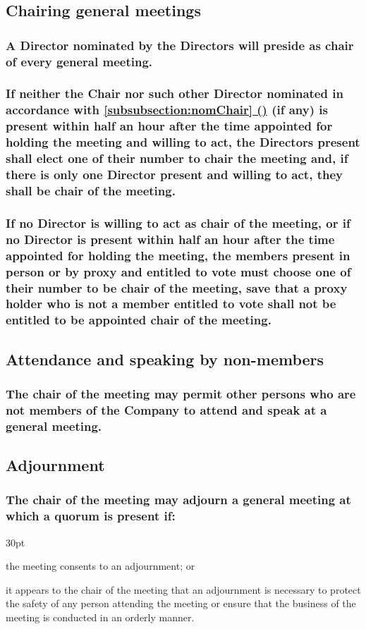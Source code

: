 \documentclass[12pt]{article}
\newcommand*{\fancyref}[1]{\hyperref[{#1}]{\autoref*{#1} (\nameref*{#1})}}
\def\clauseindent{30pt}
\newenvironment{subindentpara}{\begin{adjustwidth}{\clauseindent}{}\begin{hanginglist}}{\end{hanginglist}\end{adjustwidth}}
\begin{document}
\subsection{Chairing general meetings}
\subsubsection[Nominal chairing of general meetings]{\label{subsubsection:nomChair}A Director nominated by the Directors will preside as chair of every general meeting.}
\subsubsection{If neither the Chair nor such other Director nominated in accordance with \fancyref{subsubsection:nomChair} (if any) is present within half an hour after the time appointed for holding the meeting and willing to act, the Directors present shall elect one of their number to chair the meeting and, if there is only one Director present and willing to act, they shall be chair of the meeting.}
\subsubsection{If no Director is willing to act as chair of the meeting, or if no Director is present within half an hour after the time appointed for holding the meeting, the members present in person or by proxy and entitled to vote must choose one of their number to be chair of the meeting, save that a proxy holder who is not a member entitled to vote shall not be entitled to be appointed chair of the meeting.}

\subsection{Attendance and speaking by non-members}
\subsubsection{The chair of the meeting may permit other persons who are not members of the Company to attend and speak at a general meeting.}

\subsection{Adjournment}
\subsubsection{The chair of the meeting may adjourn a general meeting at which a quorum is present if:}
\begin{subindentpara}
    \item the meeting consents to an adjournment; or
    \item it appears to the chair of the meeting that an adjournment is necessary to protect the safety of any person attending the meeting or ensure that the business of the meeting is conducted in an orderly manner.
\end{subindentpara}
\end{document}
